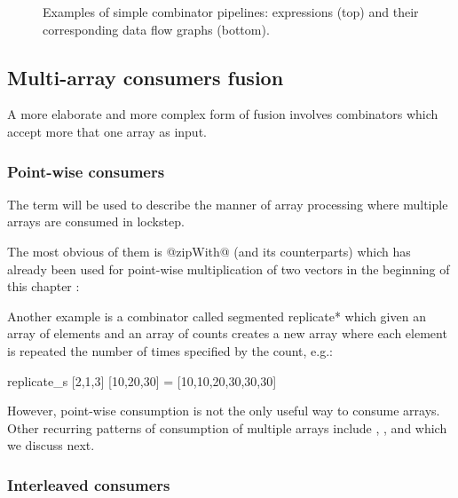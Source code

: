 \documentclass[preamble.tex]{subfiles}
\begin{document}
\begin{figure}
\begin{subfigure}{.33\textwidth}
\end{subfigure}%

\caption{Examples of simple combinator pipelines: \Haskell expressions (top) and their corresponding data flow graphs (bottom).}
\label{fig:simple-piplines}
\end{figure}



\subsection{Multi-array consumers fusion}
\label{sec:multiarray-fusion}

A more elaborate and more complex form of fusion involves combinators which accept more that one array as input.


\subsubsection{Point-wise consumers}

The term  will be used to describe the manner of array processing where multiple arrays are consumed in lockstep.

The most obvious of them is @zipWith@ (and its  counterparts) which has already been used for point-wise multiplication of two vectors in the beginning of this chapter :


Another example is a combinator called \*segmented replicate* which given an array of elements and an array of counts creates a new array where each element is repeated the number of times specified by the count, e.g.:

\begin{hscode}
replicate_s [2,1,3] [10,20,30] = [10,10,20,30,30,30]
\end{hscode}


However, point-wise consumption is not the only useful way to consume arrays. Other recurring patterns of consumption of multiple arrays include , ,  and  which we discuss next.


\subsubsection{Interleaved consumers}
\end{document}
